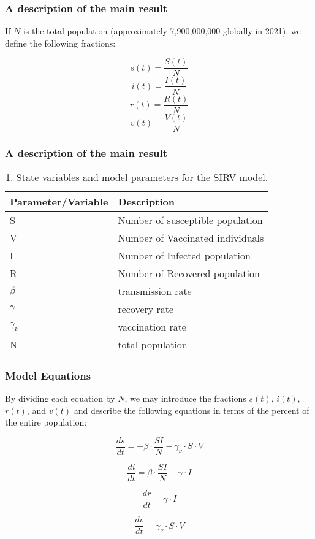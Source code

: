 \documentclass{beamer}
\begin{document}
\begin{frame} 
\frametitle{A description of the main result}
If \(N\) is the total population (approximately 7,900,000,000 globally in 2021), we define the following fractions:

    \[ s(t) = \frac{S(t)}{N} \]
    \[ i(t) = \frac{I(t)}{N} \]
    \[ r(t) = \frac{R(t)}{N} \]
    \[ v(t) = \frac{V(t)}{N} \]

\end{frame} 

\begin{frame} 
\frametitle{A description of the main result}
\begin{table}
\begin{center}
\begin{tabular}{|l|l|} \hline 
Parameter/Variable& Description\\ \hline \hline
S& Number of susceptible population\\ \hline 
V&  Number of Vaccinated individuals\\ \hline
 I&Number of Infected population\\\hline
 R&Number of Recovered population\\\hline
 $\beta$&transmission rate\\\hline
 $\gamma$&recovery rate\\\hline
 $\gamma_{\nu}$&vaccination rate \\\hline
 N& total population\\\hline\end{tabular}
\caption{1. State variables and model parameters for the SIRV model. \label{Table}}

\end{center}
\end{table} 
\end{frame} 

\begin{frame} 
\frametitle{Model Equations}
    By dividing each equation by \(N\), we may introduce the fractions \(s(t)\), \(i(t)\), \(r(t)\), and \(v(t)\) and describe the following equations in terms of the percent of the entire population:

\[ \frac{ds}{dt} = -\beta \cdot \frac{SI}{N} - \gamma_{\nu} \cdot S \cdot V\]

\[ \frac{di}{dt} = \beta \cdot \frac{SI}{N}  - \gamma \cdot I \]

\[ \frac{dr}{dt} = \gamma \cdot I \]

\[ \frac{dv}{dt} = \gamma_{\nu} \cdot S \cdot V \]
\end{frame} 
\end{document}
